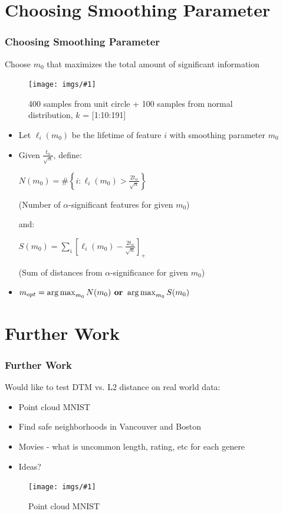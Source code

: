 \documentclass[9pt, dvipsnames]{beamer} %
\newcommand {\image}[3] {
    \begin{figure}
        \begin{center}
		\texttt{[image: imgs/\#1]}
		\caption{#2}
        \end{center}
    \end{figure}
}
\DeclareMathOperator*{\argmax}{arg\,max}
\begin{document}
    \section{Choosing Smoothing Parameter}\label{sec:param}
    \begin{frame}
	    \frametitle{\textbf{Choosing Smoothing Parameter}}
	    \centerline{Choose $m_0$ that maximizes the total amount of significant information}
	    \image{maxpersistence_example.png}{400 samples from unit circle + 100 samples from normal distribution, $k$ = [1:10:191]}{0.9}
    \end{frame}
    \begin{frame}
	    \begin{itemize}
		    \item
			    Let $\ell_i(m_0)$ be the lifetime of feature $i$ with smoothing parameter $m_0$
		    \item
			    Given $\frac{t_\alpha}{\sqrt{n}}$, define:\\
			    \centerline{$ N(m_0) = \# \left\{ i: \ell_i(m_0) > \frac{2t_\alpha}{\sqrt{n}} \right\}$}
			    \centerline{(Number of $\alpha$-significant features for given $m_0$)}
			    and:\\
			    \centerline{$ S(m_0) = \sum_i \left[ \ell_i(m_0) - \frac{2t_\alpha}{\sqrt{n}} \right]_+ $}
			    \centerline{(Sum of distances from $\alpha$-significance for given $m_0$)}
		    \item
			    $ m_{opt} = \argmax_{m_0} N(m_0) \text{\textbf{ or }} \argmax_{m_0} S(m_0) $
	    \end{itemize}
    \end{frame}

	\section{Further Work}\label{sec:work}
	\begin{frame}
	    \frametitle{\textbf{Further Work}}
		Would like to test DTM vs. L2 distance on real world data:
		\begin{itemize}
			\item
				Point cloud MNIST
			\item
				Find safe neighborhoods in Vancouver and Boston
			\item
				Movies - what is uncommon length, rating, etc for each genere
			\item
				Ideas?
		\end{itemize}
		\image{mnist.png}{Point cloud MNIST}{0.5}
	\end{frame}
\end{document}
